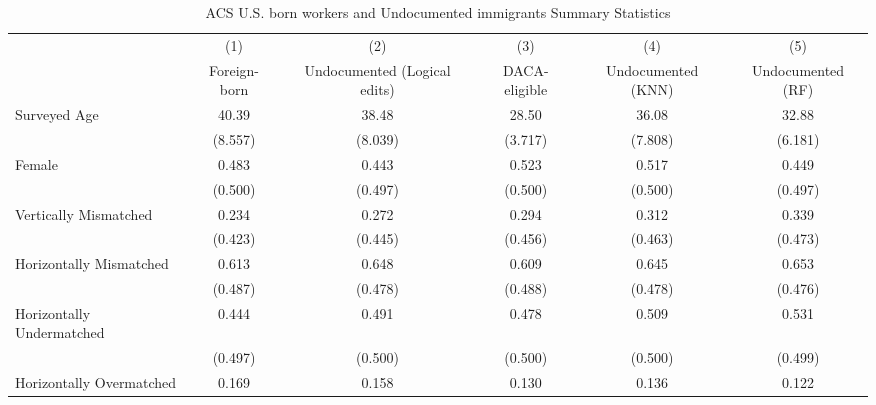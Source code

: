 \begin{table}[htbp]\centering
\def\sym#1{\ifmmode^{#1}\else\(^{#1}\)\fi}
\caption{ACS U.S. born workers and Undocumented immigrants Summary Statistics \label{tab:sum}}
\begin{tabular}{l*{5}{c}}
\hline\hline
                    &\multicolumn{1}{c}{(1)}         &\multicolumn{1}{c}{(2)}         &\multicolumn{1}{c}{(3)}         &\multicolumn{1}{c}{(4)}         &\multicolumn{1}{c}{(5)}         \\
                    &Foreign-born         &Undocumented (Logical edits)         &DACA-eligible         &Undocumented (KNN)         &Undocumented (RF)         \\
\hline
Surveyed Age        &       40.39         &       38.48         &       28.50         &       36.08         &       32.88         \\
                    &     (8.557)         &     (8.039)         &     (3.717)         &     (7.808)         &     (6.181)         \\
[1em]
Female              &       0.483         &       0.443         &       0.523         &       0.517         &       0.449         \\
                    &     (0.500)         &     (0.497)         &     (0.500)         &     (0.500)         &     (0.497)         \\
[1em]
Vertically Mismatched&       0.234         &       0.272         &       0.294         &       0.312         &       0.339         \\
                    &     (0.423)         &     (0.445)         &     (0.456)         &     (0.463)         &     (0.473)         \\
[1em]
Horizontally Mismatched&       0.613         &       0.648         &       0.609         &       0.645         &       0.653         \\
                    &     (0.487)         &     (0.478)         &     (0.488)         &     (0.478)         &     (0.476)         \\
[1em]
Horizontally Undermatched&       0.444         &       0.491         &       0.478         &       0.509         &       0.531         \\
                    &     (0.497)         &     (0.500)         &     (0.500)         &     (0.500)         &     (0.499)         \\
[1em]
Horizontally Overmatched&       0.169         &       0.158         &       0.130         &       0.136         &       0.122         \\

\end{tabular}
\end{table}

